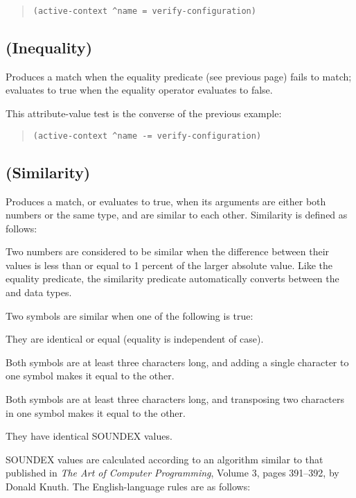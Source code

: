 \begin{quote}
\begin{verbatim}
(active-context ^name = verify-configuration)
\end{verbatim}
\end{quote}

\subsection{\co{-=} (Inequality)}

Produces a match when the equality predicate (see previous page) fails
to match; evaluates to true when the equality operator evaluates to
false.

\Example
This attribute-value test is the converse of the previous
example:
\begin{quote}
\begin{verbatim}
(active-context ^name -= verify-configuration)
\end{verbatim}
\end{quote}


\subsection{\co{\~{}=} (Similarity)}

Produces a match, or evaluates to true, when its arguments are either
both numbers or the same type, and are similar to each
other. Similarity is defined as follows:

Two numbers are considered to be similar when the difference between
their values is less than or equal to 1 percent of the larger absolute
value. Like the equality predicate, the similarity predicate
automatically converts between the  and  data types.

Two symbols are similar when one of the following is true:

They are identical or equal (equality is independent of case).

Both symbols are at least three characters long, and adding a single
character to one symbol makes it equal to the other.

Both symbols are at least three characters long, and transposing two
characters in one symbol makes it equal to the other.

They have identical SOUNDEX values.

SOUNDEX values are calculated according to an algorithm similar to
that published in \emph{The Art of Computer Programming}, Volume 3,
pages 391--392, by Donald Knuth.  The English-language rules are as
follows:

